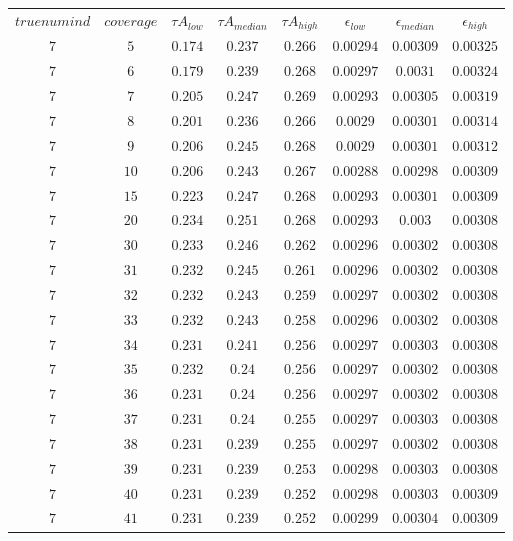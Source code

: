 \begin{table}[H]
\begin{tabular}{cccccccc}
$truenumind$ & $coverage$ & ${\tau}A_{low}$ & ${\tau}A_{median}$ & ${\tau}A_{high}$ & $\epsilon_{low}$ & $\epsilon_{median}$ & $\epsilon_{high}$\\
$7$ & $5$ & $0.174$ & $0.237$ & $0.266$ & $0.00294$ & $0.00309$ & $0.00325$\\
$7$ & $6$ & $0.179$ & $0.239$ & $0.268$ & $0.00297$ & $0.0031$ & $0.00324$\\
$7$ & $7$ & $0.205$ & $0.247$ & $0.269$ & $0.00293$ & $0.00305$ & $0.00319$\\
$7$ & $8$ & $0.201$ & $0.236$ & $0.266$ & $0.0029$ & $0.00301$ & $0.00314$\\
$7$ & $9$ & $0.206$ & $0.245$ & $0.268$ & $0.0029$ & $0.00301$ & $0.00312$\\
$7$ & $10$ & $0.206$ & $0.243$ & $0.267$ & $0.00288$ & $0.00298$ & $0.00309$\\
$7$ & $15$ & $0.223$ & $0.247$ & $0.268$ & $0.00293$ & $0.00301$ & $0.00309$\\
$7$ & $20$ & $0.234$ & $0.251$ & $0.268$ & $0.00293$ & $0.003$ & $0.00308$\\
$7$ & $30$ & $0.233$ & $0.246$ & $0.262$ & $0.00296$ & $0.00302$ & $0.00308$\\
$7$ & $31$ & $0.232$ & $0.245$ & $0.261$ & $0.00296$ & $0.00302$ & $0.00308$\\
$7$ & $32$ & $0.232$ & $0.243$ & $0.259$ & $0.00297$ & $0.00302$ & $0.00308$\\
$7$ & $33$ & $0.232$ & $0.243$ & $0.258$ & $0.00296$ & $0.00302$ & $0.00308$\\
$7$ & $34$ & $0.231$ & $0.241$ & $0.256$ & $0.00297$ & $0.00303$ & $0.00308$\\
$7$ & $35$ & $0.232$ & $0.24$ & $0.256$ & $0.00297$ & $0.00302$ & $0.00308$\\
$7$ & $36$ & $0.231$ & $0.24$ & $0.256$ & $0.00297$ & $0.00302$ & $0.00308$\\
$7$ & $37$ & $0.231$ & $0.24$ & $0.255$ & $0.00297$ & $0.00303$ & $0.00308$\\
$7$ & $38$ & $0.231$ & $0.239$ & $0.255$ & $0.00297$ & $0.00302$ & $0.00308$\\
$7$ & $39$ & $0.231$ & $0.239$ & $0.253$ & $0.00298$ & $0.00303$ & $0.00308$\\
$7$ & $40$ & $0.231$ & $0.239$ & $0.252$ & $0.00298$ & $0.00303$ & $0.00309$\\
$7$ & $41$ & $0.231$ & $0.239$ & $0.252$ & $0.00299$ & $0.00304$ & $0.00309$\\

\end{tabular}
\end{table}
